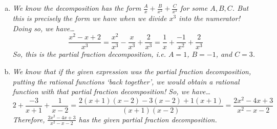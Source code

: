 \documentclass[11pt,letterpaper]{article}
\begin{document}
\begin{enumerate}[(a)]
\item {\itshape We know the decomposition has the form $\tfrac{A}{x} + \tfrac{B}{x^2} + \tfrac{C}{x^3}$ for some $A, B, C$. But this is precisely the form we have when we divide $x^3$ into the numerator! Doing so, we have\dots
	\[
	\dfrac{x^2 - x + 2}{x^3}= \dfrac{x^2}{x^3} - \dfrac{x}{x^3} + \dfrac{2}{x^3}= \dfrac{1}{x} + \dfrac{-1}{x^2} + \dfrac{2}{x^3}
	\]
So, this is the partial fraction decomposition, i.e. $A= 1$, $B= -1$, and $C= 3$.}

\item {\itshape We know that if the given expression was the partial fraction decomposition, putting the rational functions `back together', we would obtain a rational function with that partial fraction decomposition! So, we have\dots
	\[
	2 + \dfrac{-3}{x + 1} + \dfrac{1}{x - 2}= \dfrac{2(x + 1)(x - 2) - 3(x - 2) + 1(x + 1)}{(x + 1)(x - 2)}= \dfrac{2x^2 - 4x + 3}{x^2 - x - 2}
	\]
Therefore, $\tfrac{2x^2 - 4x + 3}{x^2 - x - 2}$ has the given partial fraction decomposition.}
\end{enumerate}
\end{document}
